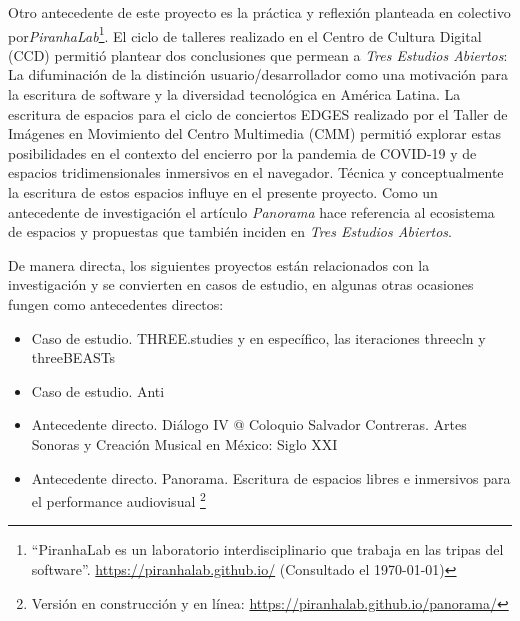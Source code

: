 Otro antecedente de este proyecto es la práctica y reflexión planteada en colectivo por\textit{PiranhaLab}\footnote{``PiranhaLab es un laboratorio interdisciplinario que trabaja en las tripas del software''. \url{https://piranhalab.github.io/} (Consultado el \today)}. El ciclo de talleres realizado en el Centro de Cultura Digital (CCD) permitió plantear dos conclusiones que permean a \textit{Tres Estudios Abiertos}: La difuminación de la distinción usuario/desarrollador como una motivación para la escritura de software y la diversidad tecnológica en América Latina. La escritura de espacios para el ciclo de conciertos EDGES realizado por el Taller de Imágenes en Movimiento del Centro Multimedia (CMM) permitió explorar estas posibilidades en el contexto del encierro por la pandemia de COVID-19 y de espacios tridimensionales inmersivos en el navegador. Técnica y conceptualmente la escritura de estos espacios influye en el presente proyecto. Como un antecedente de investigación el artículo \textit{Panorama} \citep{panoramaArticulo} hace referencia al ecosistema de espacios y propuestas que también inciden en \textit{Tres Estudios Abiertos}.


De manera directa, los siguientes proyectos están relacionados con la investigación y se convierten en casos de estudio, en algunas otras ocasiones fungen como antecedentes directos:

\begin{itemize}

\item Caso de estudio. THREE.studies \citep{threestudies} y en específico, las iteraciones threecln \citep{threecln} y threeBEASTs \citep{threeBEASTs}
\item Caso de estudio. Anti \citep{anti} 
\item Antecedente directo. Diálogo IV @ Coloquio Salvador Contreras. Artes Sonoras y Creación Musical en México: Siglo XXI \citep{dialogo}
\item Antecedente directo. Panorama. Escritura de espacios libres e inmersivos para el performance audiovisual \citep{panoramaArticulo}\footnote{Versión en construcción y en línea: \url{https://piranhalab.github.io/panorama/}}
  
\end{itemize}


